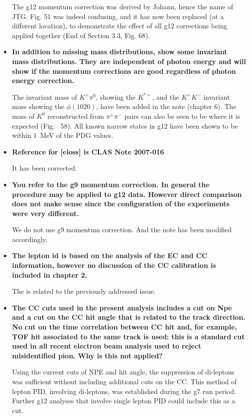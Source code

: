 \documentclass[ 12 pt]{article}
\begin{document}
\begin{itemize}
The g12 momentum correction was derived by Johann, hence the name of JTG. Fig. 51 was indeed confusing, and it has  now been replaced (at a different location), to demonstrate the effect of all g12 corrections being applied together (End of Section 3.3, Fig. 68).

\item \textbf{In addition to missing mass distributions, show some invariant mass
distributions. They are independent of photon energy and will show if the
momentum corrections are good regardless of photon energy correction.}

The invariant mass of $K^+\pi^0$, showing the $K^{*+}$, and the $K^+K^-$ invariant mass showing the $\phi(1020)$,  have been added in the note (chapter 6). The mass of $K^0$ reconstructed from $\pi^+\pi^-$ pairs can also be seen to be where it is expected (Fig. ~58).  All known narrow states in g12 have been shown to be within $1$~MeV of the PDG values.

\item \textbf{Reference for [eloss] is CLAS Note 2007-016 }

It has been corrected.

\item \textbf{You refer to the g9 momentum correction. In general the procedure may be
applied to g12 data. However direct comparison does not make sense since
the configuration of the experiments were very different.}

We do not use g9 momentum correction. And the note has been modified accordingly.


\item  \textbf{The lepton id is based on the analysis of the EC and CC information, however
no discussion of the CC calibration is included in chapter 2.}

The is related to the previously addressed issue.


\item  \textbf{The CC cuts used in the present analysis includes a cut on Npe and a cut on
the CC hit angle that is related to the track direction. No cut on the time
correlation between CC hit and, for example, TOF hit associated to the same
track is used: this is a standard cut used in all recent electron beam analysis
used to reject misidentified pion. Why is this not applied?}

Using the current cuts of NPE and hit angle, the suppression of di-leptons was sufficient without including additional cuts on the CC. This method of lepton PID, involving di-leptons, was established during the g7 run period. Further g12 analyses that involve single lepton PID could include this as a cut.




\end{itemize}
\end{document}
